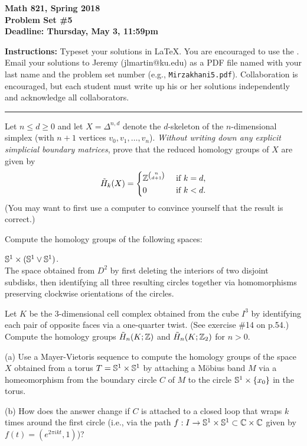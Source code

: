 

\thispagestyle{empty}
{\bf Math 821, Spring 2018\\
Problem Set \#5\\
Deadline: Thursday, May 3, 11:59pm}

\textbf{Instructions:} Typeset your solutions in LaTeX.  You are encouraged to use the . Email your solutions to Jeremy (jlmartin@ku.edu) as a PDF file named with your last name and the problem set number (e.g., \texttt{Mirzakhani5.pdf}).  Collaboration is encouraged, but each student must write up his or her solutions independently and acknowledge all collaborators.
\medskip\hrule

\prob Let $n\leq d\geq 0$ and let $X=\Delta^{n,d}$ denote the $d$-skeleton of the $n$-dimensional simplex (with $n+1$ vertices $v_0,v_1,\dots,v_n$).  
\emph{Without writing down any explicit simplicial boundary matrices}, prove that the reduced homology groups of $X$ are given by
\[\tilde H_k(X) = \begin{cases}
\mathbb{Z}^{\binom{n}{d+1}} & \text{ if $k=d$,}\\
0 & \text{ if $k<d$}.
\end{cases}\]
(You may want to first use a computer to convince yourself that the result is correct.)

\vfill\prob [Hatcher p.156 \#9bc]  Compute the homology groups of the following spaces:

\probpart $\mathbb{S}^1\times(\mathbb{S}^1\vee \mathbb{S}^1)$.\\
\padup\probpart The space obtained from $D^2$ by first deleting the interiors of two disjoint subdisks, then identifying all three resulting circles together via homomorphisms preserving clockwise orientations of the circles.

\vfill\prob [Hatcher p.156 \#11] Let $K$ be the 3-dimensional cell complex obtained from the cube $I^3$ by identifying each pair of opposite faces via a one-quarter twist.  (See exercise \#14 on p.54.)  Compute the homology groups $\tilde H_n(K;\mathbb{Z})$ and $\tilde H_n(K;\mathbb{Z}_2)$ for $n>0$.

\vfill{} (a) Use a Mayer-Vietoris sequence to compute the homology groups of the space $X$ obtained from a torus $T=\mathbb{S}^1\times \mathbb{S}^1$ by attaching a M\"obius band $M$ via a homeomorphism from the boundary circle $C$ of $M$ to the circle $\mathbb{S}^1\times\{x_0\}$ in the torus.

(b) How does the answer change if $C$ is attached to a closed loop that wraps $k$ times around the first circle (i.e., via the path $f:I\to\mathbb{S}^1\times\mathbb{S}^1\subset\mathbb{C}\times\mathbb{C}$ given by $f(t)=(e^{2\pi i kt},1)$)?

